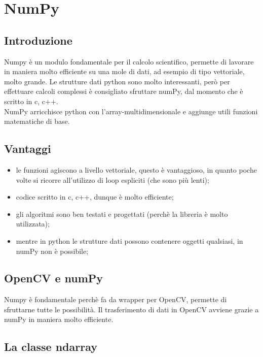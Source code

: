 \chapter{NumPy}

\section{Introduzione}

Numpy è un modulo fondamentale per il calcolo scientifico, permette di lavorare in maniera molto efficiente su una mole di dati, ad esempio di tipo vettoriale, molto grande. Le strutture dati python sono molto interessanti, però per effettuare calcoli complessi è consigliato sfruttare numPy, dal momento che è scritto in c, c++.\\
NumPy arricchisce python con l'array-multidimensionale e aggiunge utili funzioni matematiche di base.

\section{Vantaggi}

\begin{itemize}
	\item le funzioni agiscono a livello vettoriale, questo è vantaggioso, in quanto poche volte si ricorre all'utilizzo di loop espliciti (che sono più lenti);
	\item codice scritto in c, c++, dunque è molto efficiente;
	\item gli algoritmi sono ben testati e progettati (perchè la libreria è molto utilizzata);
	\item mentre in python le strutture dati possono contenere oggetti qualsiasi, in numPy non è possibile;
\end{itemize}

\section{OpenCV e numPy}

Numpy è fondamentale perchè fa da wrapper per OpenCV, permette di sfruttarne tutte le possibilità. Il trasferimento di dati in OpenCV avviene grazie a numPy in maniera molto efficiente.

\section{La classe ndarray}

